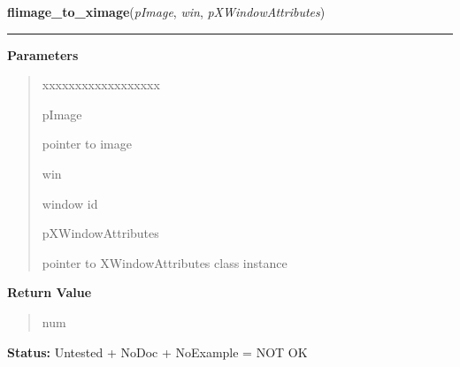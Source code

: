 \hspace{.8\funcindent}\begin{boxedminipage}{\funcwidth}

    \raggedright \textbf{flimage\_to\_ximage}(\textit{pImage}, \textit{win}, \textit{pXWindowAttributes})

    \vspace{-1.5ex}

    \rule{\textwidth}{0.5\fboxrule}
\setlength{\parskip}{2ex}
\setlength{\parskip}{1ex}
      \textbf{Parameters}
      \vspace{-1ex}

      \begin{quote}
        \begin{Ventry}{xxxxxxxxxxxxxxxxxx}

          \item[pImage]

          pointer to image

          \item[win]

          window id

          \item[pXWindowAttributes]

          pointer to XWindowAttributes class instance

        \end{Ventry}

      \end{quote}

      \textbf{Return Value}
    \vspace{-1ex}

      \begin{quote}
      num

      \end{quote}

\textbf{Status:} Untested + NoDoc + NoExample = NOT OK



    \end{boxedminipage}

    \label{xformslib:library:flimage_write_annotation}

    \vspace{0.5ex}

